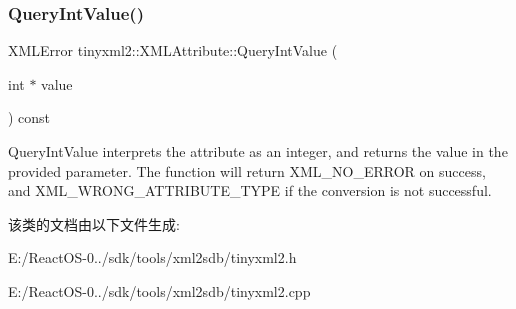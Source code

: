 \subsubsection{\texorpdfstring{Query\+Int\+Value()}{QueryIntValue()}}
{\footnotesize\ttfamily X\+M\+L\+Error tinyxml2\+::\+X\+M\+L\+Attribute\+::\+Query\+Int\+Value (\begin{DoxyParamCaption}\item[{int $\ast$}]{value }\end{DoxyParamCaption}) const}

Query\+Int\+Value interprets the attribute as an integer, and returns the value in the provided parameter. The function will return X\+M\+L\+\_\+\+N\+O\+\_\+\+E\+R\+R\+OR on success, and X\+M\+L\+\_\+\+W\+R\+O\+N\+G\+\_\+\+A\+T\+T\+R\+I\+B\+U\+T\+E\+\_\+\+T\+Y\+PE if the conversion is not successful. 

该类的文档由以下文件生成\+:\begin{DoxyCompactItemize}
\item 
E\+:/\+React\+O\+S-\/0../sdk/tools/xml2sdb/tinyxml2.\+h\item 
E\+:/\+React\+O\+S-\/0../sdk/tools/xml2sdb/tinyxml2.\+cpp\end{DoxyCompactItemize}

